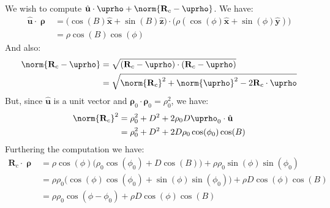 \documentclass[crop=false,class=book,oneside]{standalone}
\begin{document}
            We wish to compute
            $\hat{\mathbf{u}}\cdot%
             \boldsymbol{\uprho}+%
             \norm{\mathbf{R}_{c}-\boldsymbol{\uprho}}$.
            We have:
            \begin{subequations}
                \begin{align}
                    \hat{\mathbf{u}}\cdot\boldsymbol{\uprho}
                    &=\big(\cos(B)\hat{\mathbf{x}}+
                           \sin(B)\hat{\mathbf{z}}\big)
                        \cdot\big(\rho(\cos(\phi)\hat{\mathbf{x}}+
                                  \sin(\phi)\hat{\mathbf{y}})\big)\\
                    &=\rho\cos(B)\cos(\phi)
                \end{align}
            \end{subequations}
            And also:
            \begin{subequations}
                \begin{align}
                    \norm{\mathbf{R}_{c}-\boldsymbol{\uprho}}
                    &=\sqrt{(\mathbf{R}_{c}-
                    \boldsymbol{\uprho})\cdot(\mathbf{R}_{c}-
                    \boldsymbol{\uprho})}\\
                    &=\sqrt{\norm{\mathbf{R}_{c}}^2+
                    \norm{\boldsymbol{\uprho}}^2-
                    2\mathbf{R}_{c}\cdot\boldsymbol{\uprho}}
                \end{align}
            \end{subequations}
            But, since $\hat{\mathbf{u}}$ is a unit vector and
            $\boldsymbol{\rho}_{0}\cdot\boldsymbol{\rho}_{0}%
             =\rho_{0}^{2}$,
            we have:
            \begin{subequations}
                \begin{align}
                    \norm{\mathbf{R}_{c}}^{2}
                    &=\rho_{0}^2+D^{2}+2\rho_{0}D
                    \boldsymbol{\uprho}_{0}\cdot\hat{\mathbf{u}}\\
                    &=\rho_{0}^2+D^{2}+
                    2D\rho_{0}\cos(\phi_{0})\cos(B)
                \end{align}
            \end{subequations}
            Furthering the computation we have:
            \begin{subequations}
                \begin{align}
                    \mathbf{R}_{c}\cdot\boldsymbol{\uprho}
                    &=\rho\cos(\phi)
                    \big(\rho_{0}\cos(\phi_{0})+D\cos(B)\big)+
                    \rho\rho_{0}\sin(\phi)\sin(\phi_{0})\\
                    &=\rho\rho_{0}
                    \big(\cos(\phi)\cos(\phi_{0})+
                         \sin(\phi)\sin(\phi_{0})\big)+
                    \rho{D}\cos(\phi)\cos(B)\\
                    &=\rho\rho_{0}\cos(\phi-\phi_{0})+
                    \rho{D}\cos(\phi)\cos(B)
                \end{align}
            \end{subequations}
\end{document}
